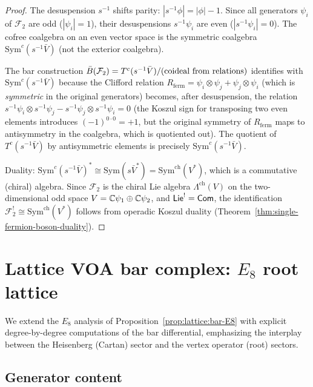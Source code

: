 \begin{proof}
The desuspension $s^{-1}$ shifts parity:
$|s^{-1}\phi| = |\phi| - 1$.  Since all generators $\psi_i$ of
$\mathcal{F}_2$ are odd ($|\psi_i| = 1$), their desuspensions
$s^{-1}\psi_i$ are even ($|s^{-1}\psi_i| = 0$).  The cofree
coalgebra on an even vector space is the symmetric coalgebra
$\mathrm{Sym}^c(s^{-1}\bar{V})$ (not the exterior coalgebra).

The bar construction $\bar{B}(\mathcal{F}_2) = T^c(s^{-1}\bar{V})
/\text{(coideal from relations)}$ identifies with
$\mathrm{Sym}^c(s^{-1}\bar{V})$ because the Clifford
relation $R_{\mathrm{ferm}} = \psi_i \otimes \psi_j + \psi_j \otimes \psi_i$
(which is \emph{symmetric} in the original generators) becomes, after
desuspension, the relation $s^{-1}\psi_i \otimes s^{-1}\psi_j
- s^{-1}\psi_j \otimes s^{-1}\psi_i = 0$
(the Koszul sign for transposing two even elements introduces
$(-1)^{0 \cdot 0} = +1$, but the original symmetry of $R_{\mathrm{ferm}}$
maps to antisymmetry in the coalgebra, which is quotiented out).
The quotient of $T^c(s^{-1}\bar{V})$ by antisymmetric elements
is precisely $\mathrm{Sym}^c(s^{-1}\bar{V})$.

Duality: $\mathrm{Sym}^c(s^{-1}\bar{V})^*
\cong \mathrm{Sym}(s\bar{V}^*) = \mathrm{Sym}^{\mathrm{ch}}(V^*)$,
which is a commutative (chiral) algebra.  Since $\mathcal{F}_2$
is the chiral Lie algebra $\Lambda^{\mathrm{ch}}(V)$ on the
two-dimensional odd space $V = \mathbb{C}\psi_1 \oplus \mathbb{C}\psi_2$,
and $\mathsf{Lie}^! = \mathsf{Com}$, the identification
$\mathcal{F}_2^! \cong \mathrm{Sym}^{\mathrm{ch}}(V^*)$
follows from operadic Koszul duality
(Theorem~\ref{thm:single-fermion-boson-duality}).
\end{proof}


\section{\texorpdfstring{Lattice VOA bar complex: $E_8$ root lattice}{Lattice VOA bar complex: E8 root lattice}}
\label{sec:E8-lattice-bar}

We extend the $E_8$ analysis of
Proposition~\ref{prop:lattice:bar-E8} with explicit degree-by-degree
computations of the bar differential, emphasizing the interplay between
the Heisenberg (Cartan) sector and the vertex operator (root) sectors.

\subsection{Generator content}

